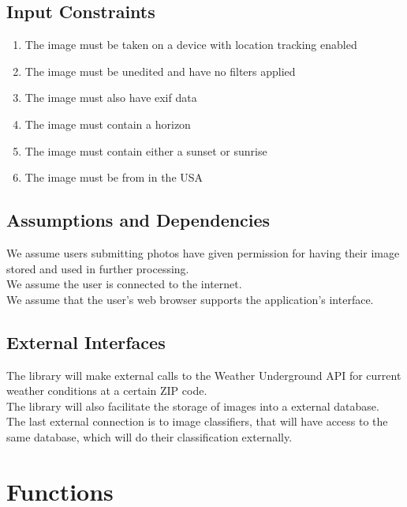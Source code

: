 \documentclass[journal,10pt,draftclsnofoot,onecolumn]{IEEEtran}
\begin{document}
\begin{singlespace}
	\subsection{Input Constraints}
	\begin{enumerate}
		\item The image must be taken on a device with location tracking enabled
		\item The image must be unedited and have no filters applied
		\item The image must also have exif data
		\item The image must contain a horizon
		\item The image must contain either a sunset or sunrise
		\item The image must be from in the USA
	\end{enumerate}

	\subsection{Assumptions and Dependencies}
		We assume users submitting photos have given permission for having their image stored and used in further processing.\\
		We assume the user is connected to the internet.\\
		We assume that the user's web browser supports the application's interface.\\


	\subsection{External Interfaces}
		The library will make external calls to the Weather Underground API for current weather conditions at a certain ZIP code.\\
		The library will also facilitate the storage of images into a external database.\\
		The last external connection is to image classifiers, that will have access to the same database, which will do their classification externally.

\clearpage

\section{Functions}

\end{singlespace}
\end{document}
